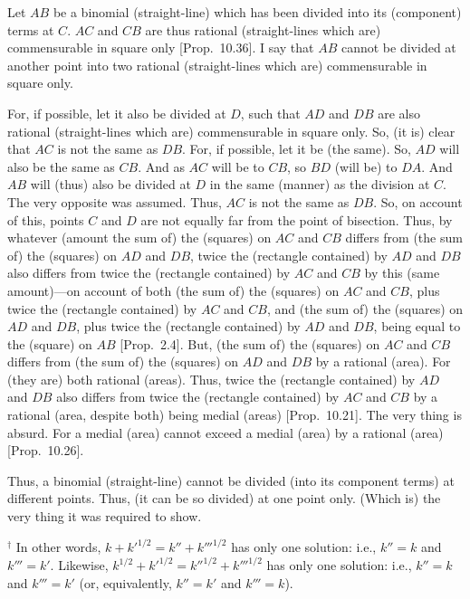 \begin{Parallel}{}{}
{Let $AB$ be a binomial (straight-line) which has been divided into its
(component) terms at $C$. $AC$ and $CB$ are thus
rational (straight-lines which are) commensurable in square only [Prop.~10.36]. I say that $AB$ cannot be divided
at another point
into two rational (straight-lines which are) commensurable in square only.

For, if possible, let it also be divided at $D$, such that $AD$ and
$DB$ are also rational (straight-lines which are) commensurable in
square only. So, (it is) clear that $AC$ is not the same as $DB$.
For, if possible, let it be (the same). So, $AD$ will also be the same
as $CB$. And as $AC$ will be to $CB$, so $BD$ (will be) to $DA$.
And $AB$ will (thus) also be divided at $D$ in the same (manner) as the division at $C$. The very opposite was assumed. Thus, $AC$ is not the
same as $DB$. So, on account of this,  points $C$ and $D$ are
not equally far from the point of bisection. Thus, by whatever (amount the sum of) the (squares) on $AC$ and $CB$ differs from (the sum of) the
(squares) on $AD$ and $DB$, twice the (rectangle contained)
by $AD$ and $DB$ also differs from twice the (rectangle contained)
by $AC$ and $CB$ by this (same amount)---on account of both (the sum of) the (squares) on $AC$ and
$CB$, plus twice the (rectangle contained) by $AC$ and $CB$, and
(the sum of) the (squares) on $AD$ and $DB$, plus twice the
(rectangle contained) by $AD$ and $DB$,  being equal to the (square) on $AB$ [Prop.~2.4]. But, (the sum of) the
(squares) on  $AC$ and $CB$ differs from (the sum of) the (squares)
on $AD$ and $DB$ by a rational (area). For (they are) both rational (areas).
Thus, twice the (rectangle contained) by $AD$ and $DB$ also differs from
twice the (rectangle contained) by $AC$ and $CB$ by a
rational (area, despite both) being medial (areas) [Prop.~10.21]. The very thing is absurd. For a
medial (area) cannot exceed a medial (area) by a rational (area) [Prop.~10.26].

Thus, a binomial (straight-line) cannot be divided (into its component terms) at different points.
Thus, (it can be so divided) at one point only. (Which is) the very thing it
was required to show.}
\end{Parallel}
{\footnotesize\noindent$^\dag$ In other words, $k + k'^{1/2} = k'' + k'''^{1/2}$
has only one solution: {i.e.}, $k''=k$ and $k'''=k'$. Likewise,
$k^{1/2} + k'^{1/2} = k''^{1/2}+ k'''^{1/2}$ has only one solution:
{i.e.}, $k''=k$ and $k'''=k'$ (or, equivalently, $k''=k'$ and $k'''=k$).}

